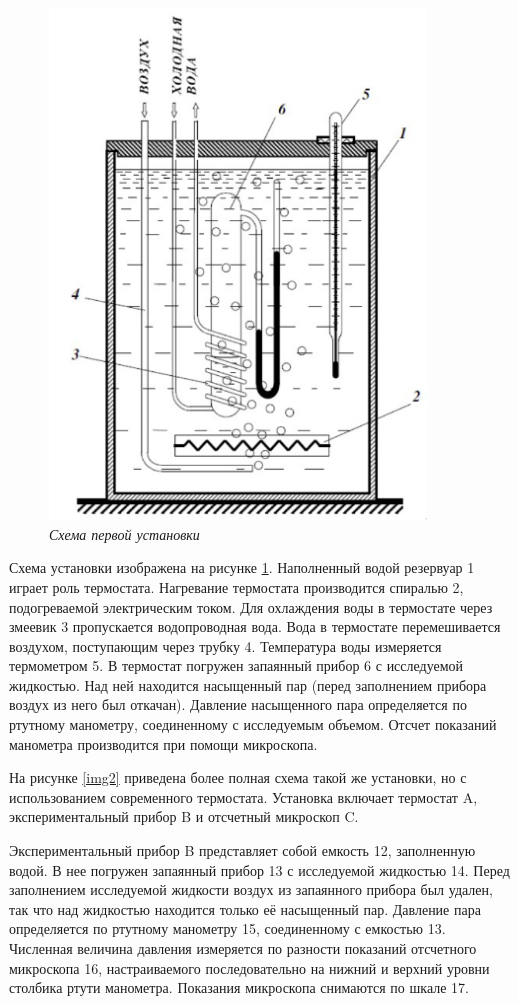 \documentclass[a4paper, 12pt]{article}
\begin{document}
\begin{figure}
    \centering    
	\includegraphics[width=10cm]{ust1.png}
	\caption{\textit{Схема первой установки}}
	\label{img1}
\end{figure}

Схема установки изображена на рисунке \ref{img1}. Наполненный водой резервуар 1 играет роль термостата. Нагревание термостата производится спиралью 2, подогреваемой электрическим током. Для охлаждения воды в термостате через змеевик 3 пропускается водопроводная вода. Вода в термостате перемешивается воздухом, поступающим через трубку 4. Температура воды измеряется термометром 5. В термостат погружен запаянный прибор 6 с исследуемой жидкостью. Над ней находится насыщенный пар (перед заполнением прибора воздух из него был откачан). Давление насыщенного пара определяется по ртутному манометру, соединенному с исследуемым объемом. Отсчет показаний манометра производится при помощи микроскопа.

На рисунке \ref{img2} приведена более полная схема такой же установки, но с использованием современного термостата. Установка включает термостат A, экспериментальный прибор B и отсчетный микроскоп C.

Экспериментальный прибор B представляет собой емкость 12, заполненную водой. В нее погружен запаянный прибор 13 с исследуемой жидкостью 14. Перед заполнением исследуемой жидкости воздух из запаянного прибора был удален, так что над жидкостью находится только её насыщенный пар. Давление пара определяется по ртутному манометру 15, соединенному с емкостью 13. Численная величина давления измеряется по разности показаний отсчетного микроскопа 16, настраиваемого последовательно на нижний и верхний уровни столбика ртути манометра. Показания микроскопа снимаются по шкале 17.
\end{document}
